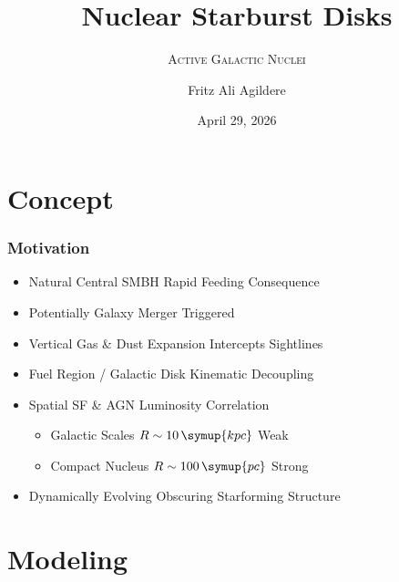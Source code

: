 


\author[F. A. Agildere]{Fritz Ali Agildere}

\date[Apr. 29, 2026]{April 29, 2026}

\title{Nuclear Starburst Disks}
\subtitle{\textsc{Active Galactic Nuclei}}

\institute[UBG]{}


	\begin{frame}[noframenumbering]
		\titlepage
	\end{frame}

	\section{Concept}

	\begin{frame}
		\frametitle{Motivation}
		\begin{itemize}
			\item<2-> Natural Central SMBH Rapid Feeding Consequence
			\item<3-> Potentially Galaxy Merger Triggered
			\item<4-> Vertical Gas \& Dust Expansion Intercepts Sightlines
			\item<5-> Fuel Region / Galactic Disk Kinematic Decoupling
			\item<6-> Spatial SF \& AGN Luminosity Correlation
			\begin{itemize}
				\item<7-> Galactic Scales $R \sim 10\,\symup{kpc}$ Weak
				\item<8-> Compact Nucleus $R \sim 100\,\symup{pc}$ Strong
			\end{itemize}
			\item<9-> Dynamically Evolving Obscuring Starforming Structure
		\end{itemize}
	\end{frame}

	\section{Modeling}

